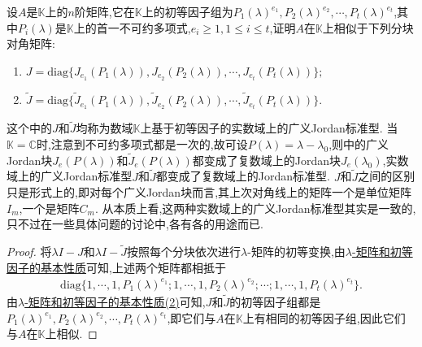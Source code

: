 \documentclass[../../main.tex]{subfiles}%
\begin{document}
\begin{proposition}\label{proposition:广义标准型理论相关结论1}
设$A$是$\mathbb{K}$上的$n$阶矩阵,它在$\mathbb{K}$上的初等因子组为$P_1(\lambda)^{e_1},P_2(\lambda)^{e_2},\cdots,P_t(\lambda)^{e_t}$,其中$P_i(\lambda)$是$\mathbb{K}$上的首一不可约多项式,$e_i\geqslant 1, 1\leqslant i\leqslant t$,证明$A$在$\mathbb{K}$上相似于下列分块对角矩阵:
\begin{enumerate}[(1)]
\item $J = \mathrm{diag}\{J_{e_1}(P_1(\lambda)),J_{e_2}(P_2(\lambda)),\cdots,J_{e_t}(P_t(\lambda))\};$

\item $\widetilde{J} = \mathrm{diag}\{\widetilde{J}_{e_1}(P_1(\lambda)),\widetilde{J}_{e_2}(P_2(\lambda)),\cdots,\widetilde{J}_{e_t}(P_t(\lambda))\}.$
\end{enumerate}
\end{proposition}
\begin{remark}
这个中的$J$和$\widetilde{J}$均称为数域$\mathbb{K}$上基于初等因子的实数域上的广义Jordan标准型. 当$\mathbb{K}=\mathbb{C}$时,注意到不可约多项式都是一次的,故可设$P(\lambda)=\lambda - \lambda_0$,则中的广义Jordan块$J_e(P(\lambda))$和$\widetilde{J}_e(P(\lambda))$都变成了复数域上的Jordan块$J_e(\lambda_0)$,实数域上的广义Jordan标准型$J$和$\widetilde{J}$都变成了复数域上的Jordan标准型. $J$和$\widetilde{J}$之间的区别只是形式上的,即对每个广义Jordan块而言,其上次对角线上的矩阵一个是单位矩阵$I_m$,一个是矩阵$C_m$. 从本质上看,这两种实数域上的广义Jordan标准型其实是一致的,只不过在一些具体问题的讨论中,各有各的用途而已. 
\end{remark}
\begin{proof}
将$\lambda I - J$和$\lambda I - \widetilde{J}$按照每个分块依次进行$\lambda$-矩阵的初等变换,由\hyperref[theorem:lambda-矩阵和初等因子的基本性质]{$\lambda$-矩阵和初等因子的基本性质}可知,上述两个矩阵都相抵于
\begin{align*}
\mathrm{diag}\{1,\cdots,1,P_1(\lambda)^{e_1};1,\cdots,1,P_2(\lambda)^{e_2};\cdots;1,\cdots,1,P_t(\lambda)^{e_t}\}.
\end{align*}
由\hyperref[theorem:lambda-矩阵和初等因子的基本性质]{$\lambda$-矩阵和初等因子的基本性质(2)}可知,$J$和$\widetilde{J}$的初等因子组都是$P_1(\lambda)^{e_1},P_2(\lambda)^{e_2},\cdots,P_t(\lambda)^{e_t}$,即它们与$A$在$\mathbb{K}$上有相同的初等因子组,因此它们与$A$在$\mathbb{K}$上相似. 
\end{proof}
\end{document}

